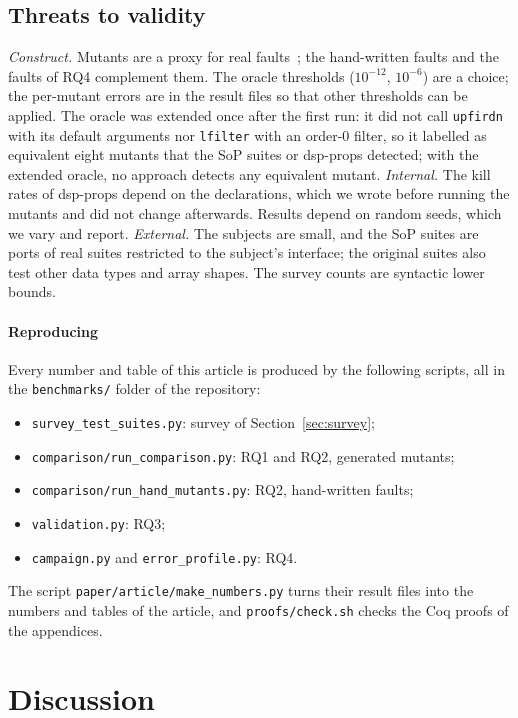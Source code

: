 \documentclass[10pt,conference]{IEEEtran}
\newcommand{\code}[1]{\texttt{#1}}
\begin{document}
\subsection{Threats to validity}
\emph{Construct.} Mutants are a proxy for real faults~\cite{just2014mutants};
the hand-written faults and the faults of RQ4 complement them. The oracle
thresholds ($10^{-12}$, $10^{-6}$) are a choice; the per-mutant errors are in
the result files so that other thresholds can be applied. The oracle was
extended once after the first run: it did not call \code{upfirdn} with its
default arguments nor \code{lfilter} with an order-0 filter, so it labelled as
equivalent eight mutants that the SoP suites or dsp-props detected; with the
extended oracle, no approach detects any equivalent mutant.
\emph{Internal.} The kill rates of dsp-props depend on the declarations, which
we wrote before running the mutants and did not change afterwards. Results
depend on random seeds, which we vary and report.
\emph{External.} The subjects are small, and the SoP suites are ports of real
suites restricted to the subject's interface; the original suites also test
other data types and array shapes. The survey counts are syntactic lower bounds.

\paragraph*{Reproducing} Every number and table of this article is produced by
the following scripts, all in the \code{benchmarks/} folder of the repository:
\begin{itemize}
\item \code{survey\_test\_suites.py}: survey of Section~\ref{sec:survey};
\item \code{comparison/run\_comparison.py}: RQ1 and RQ2, generated mutants;
\item \code{comparison/run\_hand\_mutants.py}: RQ2, hand-written faults;
\item \code{validation.py}: RQ3;
\item \code{campaign.py} and \code{error\_profile.py}: RQ4.
\end{itemize}
The script \code{paper/article/make\_numbers.py} turns their result files into
the numbers and tables of the article, and \code{proofs/check.sh} checks the
Coq proofs of the appendices.

\section{Discussion}
\label{sec:discussion}
\end{document}
